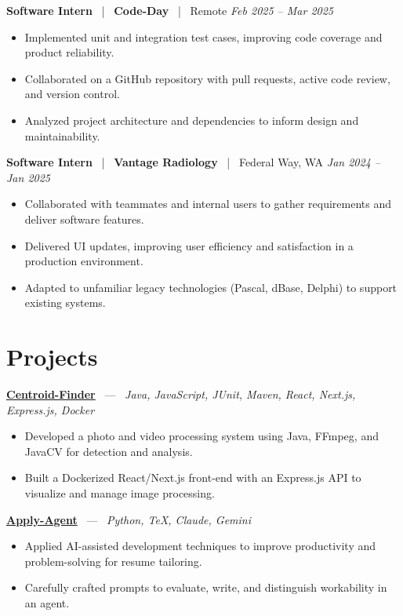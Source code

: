 \documentclass[10pt, letterpaper]{article}
\newcommand{\jobhead}[4]{%
  \vspace{5pt}%
  {\bfseries\color{dark}#1}%
  ~{\color{light}|}~%
  {\bfseries\color{navy}#2}%
  ~{\color{light}|}~%
  {\color{light}#3}%
  \hfill{\color{light}\small\textit{#4}}\\[-2pt]%
}
\newcommand{\projhead}[3]{%
  \vspace{5pt}%
  {\bfseries\color{dark}\href{#2}{#1}}%
  ~{\color{light}---}~%
  {\color{light}\small\textit{#3}}\\[-2pt]%
}
\begin{document}
\jobhead{Software Intern}{Code-Day}{Remote}{Feb 2025 – Mar 2025}
\begin{itemize}
  \item Implemented unit and integration test cases, improving code coverage and product reliability.
  \item Collaborated on a GitHub repository with pull requests, active code review, and version control.
  \item Analyzed project architecture and dependencies to inform design and maintainability.
\end{itemize}

\jobhead{Software Intern}{Vantage Radiology}{Federal Way, WA}{Jan 2024 – Jan 2025}
\begin{itemize}
  \item Collaborated with teammates and internal users to gather requirements and deliver software features.
  \item Delivered UI updates, improving user efficiency and satisfaction in a production environment.
  \item Adapted to unfamiliar legacy technologies (Pascal, dBase, Delphi) to support existing systems.
\end{itemize}

\section{Projects}

\projhead{Centroid-Finder}{https://github.com/xavierb117/centroid-finder}{Java, JavaScript, JUnit, Maven, React, Next.js, Express.js, Docker}
\begin{itemize}
  \item Developed a photo and video processing system using Java, FFmpeg, and JavaCV for detection and analysis.
  \item Built a Dockerized React/Next.js front-end with an Express.js API to visualize and manage image processing.
\end{itemize}

\projhead{Apply-Agent}{https://github.com/timmyd4/apply-agent}{Python, TeX, Claude, Gemini}
\begin{itemize}
  \item Applied AI-assisted development techniques to improve productivity and problem-solving for resume tailoring.
  \item Carefully crafted prompts to evaluate, write, and distinguish workability in an agent.
\end{itemize}
\end{document}
